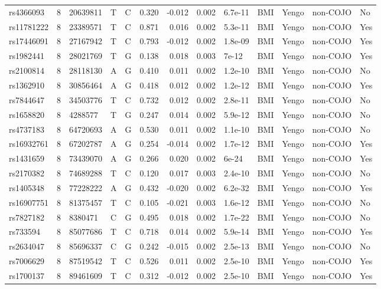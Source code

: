 \documentclass[11pt,twoside]{bristolthesis}
\begin{document}
\begin{longtable}[t]{lrlllrrrlllll}
\addlinespace
rs4366093 & 8 & 20639811 & T & C & 0.320 & -0.012 & 0.002 & 6.7e-11 & BMI & Yengo & non-COJO & No\\
rs11781222 & 8 & 23389571 & T & C & 0.871 & 0.016 & 0.002 & 5.3e-11 & BMI & Yengo & non-COJO & Yes\\
rs17446091 & 8 & 27167942 & T & C & 0.793 & -0.012 & 0.002 & 1.8e-09 & BMI & Yengo & non-COJO & Yes\\
rs1982441 & 8 & 28021769 & T & G & 0.138 & 0.018 & 0.003 & 7e-12 & BMI & Yengo & non-COJO & Yes\\
rs2100814 & 8 & 28118130 & A & G & 0.410 & 0.011 & 0.002 & 1.2e-10 & BMI & Yengo & non-COJO & No\\
\addlinespace
rs1362910 & 8 & 30856464 & A & G & 0.418 & 0.012 & 0.002 & 1.2e-12 & BMI & Yengo & non-COJO & Yes\\
rs7844647 & 8 & 34503776 & T & C & 0.732 & 0.012 & 0.002 & 2.8e-11 & BMI & Yengo & non-COJO & No\\
rs1658820 & 8 & 4288577 & T & G & 0.247 & 0.014 & 0.002 & 5.9e-12 & BMI & Yengo & non-COJO & No\\
rs4737183 & 8 & 64720693 & A & G & 0.530 & 0.011 & 0.002 & 1.1e-10 & BMI & Yengo & non-COJO & No\\
rs16932761 & 8 & 67202787 & A & G & 0.254 & -0.014 & 0.002 & 1.7e-12 & BMI & Yengo & non-COJO & Yes\\
\addlinespace
rs1431659 & 8 & 73439070 & A & G & 0.266 & 0.020 & 0.002 & 6e-24 & BMI & Yengo & non-COJO & Yes\\
rs2170382 & 8 & 74689288 & T & C & 0.120 & 0.017 & 0.003 & 2.4e-10 & BMI & Yengo & non-COJO & No\\
rs1405348 & 8 & 77228222 & A & G & 0.432 & -0.020 & 0.002 & 6.2e-32 & BMI & Yengo & non-COJO & Yes\\
rs16907751 & 8 & 81375457 & T & C & 0.105 & -0.021 & 0.003 & 1.6e-12 & BMI & Yengo & non-COJO & No\\
rs7827182 & 8 & 8380471 & C & G & 0.495 & 0.018 & 0.002 & 1.7e-22 & BMI & Yengo & non-COJO & No\\
\addlinespace
rs733594 & 8 & 85077686 & T & C & 0.718 & 0.014 & 0.002 & 5.9e-14 & BMI & Yengo & non-COJO & Yes\\
rs2634047 & 8 & 85696337 & C & G & 0.242 & -0.015 & 0.002 & 2.5e-13 & BMI & Yengo & non-COJO & No\\
rs7006629 & 8 & 87519542 & T & C & 0.526 & 0.011 & 0.002 & 2.5e-10 & BMI & Yengo & non-COJO & Yes\\
rs1700137 & 8 & 89461609 & T & C & 0.312 & -0.012 & 0.002 & 2.5e-10 & BMI & Yengo & non-COJO & Yes\\

\end{longtable}
\end{document}
